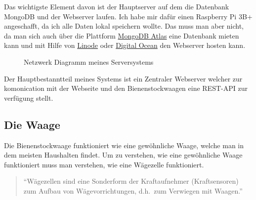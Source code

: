\documentclass[a4paper, ngerman, 12pt]{scrartcl}
\begin{document}
Das wichtigste Element davon ist der Hauptserver auf dem die Datenbank MongoDB und der Webserver laufen.
Ich habe mir dafür einen Raspberry Pi 3B+ angeschafft, da ich alle Daten lokal speichern wollte.
Das muss man aber nicht, da man sich auch über die Plattform \href{https://www.mongodb.com/cloud/atlas}{MongoDB Atlas} eine Datenbank mieten kann und mit Hilfe von \href{https://www.linode.com}{Linode} oder \href{https://www.digitalocean.com/}{Digital Ocean} den Webserver hosten kann.

\begin{figure}[ht]
	\centering
	\caption{Netzwerk Diagramm meines Serversystems\label{abb:networkdiagram}}
\end{figure}

Der Hauptbestanntteil meines Systems ist ein Zentraler Webserver welcher zur komonication mit der Webseite und den Bienenstockwaagen eine REST-API zur verfügung stellt.

\subsection{Die Waage}

Die Bienenstockwaage funktioniert wie eine gewöhnliche Waage, welche man in dem meisten Haushalten findet.
Um zu verstehen, wie eine gewöhnliche Waage funktioniert muss man verstehen, wie eine Wägezelle funktioniert.

\begin{quote}
	\enquote{Wägezellen sind eine Sonderform der Kraftaufnehmer (Kraftsensoren) zum Aufbau von Wägevorrichtungen, d.h.\ zum Verwiegen mit Waagen.}~\autocite[vgl.][]{WikiWaegezelle}
\end{quote}
\end{document}

